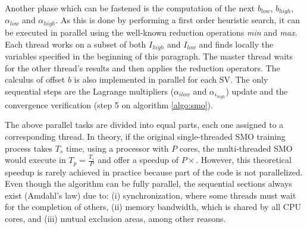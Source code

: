 \documentclass{llncs}
\begin{document}
Another phase which can be fastened is the computation of the next $b_{low}$, $b_{high}$, $\alpha_{low}$ and $\alpha_{high}$. As this is done by performing a first order heuristic search, it can be executed in parallel using the well-known reduction operations \textit{min} and \textit{max}. Each thread works on a subset of both $I_{high}$ and $I_{low}$ and finds locally the variables specified in the beginning of this paragraph. The master thread waits for the other thread's results and then applies the reduction operators. The calculus of offset $b$ is also implemented in parallel for each SV. The only sequential steps are the Lagrange multipliers ($\alpha_{i{low}}$ and $\alpha_{i_{high}}$) update and the convergence verification (step 5 on algorithm \ref{algo:smo}).

The above parallel tasks are divided into equal parts, each one assigned to a corresponding thread. In theory, if the original single-threaded \ac{SMO} training process takes $T_s$ time, using a processor with $P$ cores, the multi-threaded \ac{SMO} would execute in $T_p = \frac{T_s}{P}$ and offer a speedup of $P \times$. However, this theoretical speedup is rarely achieved in practice because part of the code is not parallelized. Even though the algorithm can be fully parallel, the sequential sections always exist (Amdahl's law) due to: (i) synchronization, where some threads must wait for the completion of others, (ii) memory bandwidth, which is shared by all CPU cores, and (iii) mutual exclusion areas, among other reasons.
\end{document}
